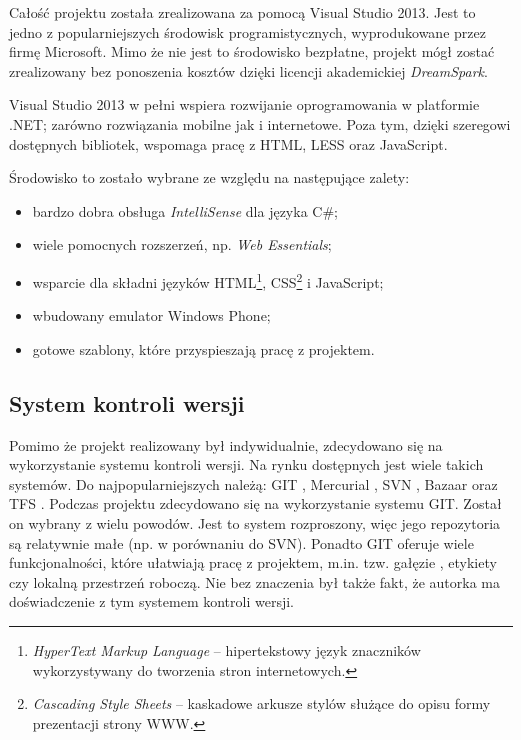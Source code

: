 \documentclass[a4paper]{book}
\begin{document}
			Całość projektu została zrealizowana za pomocą Visual Studio 2013. Jest to jedno z popularniejszych środowisk programistycznych, wyprodukowane przez firmę Microsoft. Mimo że nie jest to środowisko bezpłatne, projekt mógł zostać zrealizowany bez ponoszenia kosztów dzięki licencji akademickiej \textit{DreamSpark}. 
			
			Visual Studio 2013 w pełni wspiera rozwijanie oprogramowania w platformie .NET; zarówno rozwiązania mobilne jak i internetowe. Poza tym, dzięki szeregowi dostępnych bibliotek, wspomaga pracę z HTML, LESS oraz JavaScript.
			
			Środowisko to zostało wybrane ze względu na następujące zalety:
			\begin{itemize}
				\item bardzo  dobra obsługa \textit{IntelliSense} dla języka C\#;
				\item wiele pomocnych rozszerzeń, np. \textit{Web Essentials};
				\item wsparcie dla składni języków HTML\footnote{\emph{HyperText Markup Language} -- hipertekstowy język znaczników wykorzystywany do tworzenia stron internetowych.}, CSS\footnote{\emph{Cascading Style Sheets} -- kaskadowe arkusze stylów służące do opisu formy prezentacji strony WWW.} i JavaScript;
				\item wbudowany emulator Windows Phone;
				\item gotowe szablony, które przyspieszają pracę z projektem.
			\end{itemize}
			
			\subsection{System kontroli wersji}
			
			Pomimo że projekt realizowany był indywidualnie, zdecydowano się na wykorzystanie systemu kontroli wersji. Na rynku dostępnych jest wiele takich systemów. Do najpopularniejszych należą: GIT \cite{id:GIT}, Mercurial \cite{id:Mecurial}, SVN \cite{id:SVN}, Bazaar \cite{id:Bazaar} oraz TFS \cite{id:TFS}.
			Podczas projektu zdecydowano się na wykorzystanie systemu GIT. Został on wybrany z wielu powodów. Jest to system rozproszony, więc jego repozytoria są relatywnie małe (np. w porównaniu do SVN). Ponadto GIT oferuje wiele funkcjonalności, które ułatwiają pracę z projektem, m.in. tzw. gałęzie , etykiety czy lokalną przestrzeń roboczą. Nie bez znaczenia był także fakt, że autorka ma doświadczenie z tym systemem kontroli wersji.
\end{document}
